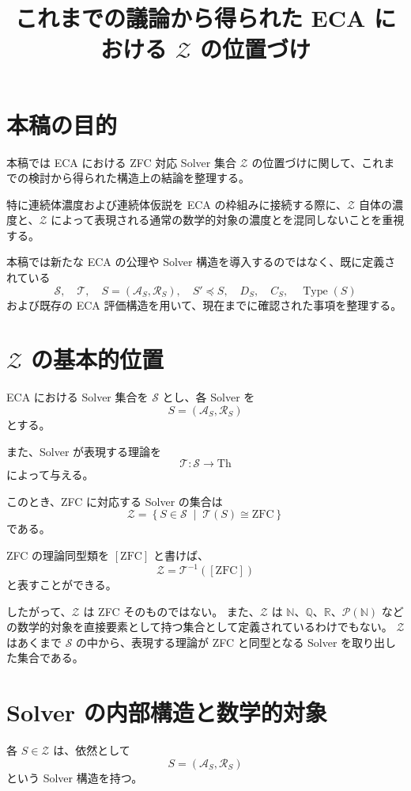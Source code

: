 \documentclass[a4paper,11pt]{article}
\title{これまでの議論から得られた ECA における $\mathcal{Z}$ の位置づけ}
\author{}
\date{}
\begin{document}
\maketitle

\section{本稿の目的}

本稿では ECA における ZFC 対応 Solver 集合 $\mathcal{Z}$ の位置づけに関して、これまでの検討から得られた構造上の結論を整理する。

特に連続体濃度および連続体仮説を ECA の枠組みに接続する際に、$\mathcal{Z}$ 自体の濃度と、$\mathcal{Z}$ によって表現される通常の数学的対象の濃度とを混同しないことを重視する。

本稿では新たな ECA の公理や Solver 構造を導入するのではなく、既に定義されている
\[
\mathcal{S},\quad
\mathcal{T},\quad
S=(\mathcal{A}_S,\mathcal{R}_S),\quad
S'\preceq S,\quad
D_S,\quad
C_S,\quad
\operatorname{Type}(S)
\]
および既存の ECA 評価構造を用いて、現在までに確認された事項を整理する。

\section{$\mathcal{Z}$ の基本的位置}

ECA における Solver 集合を $\mathcal{S}$ とし、各 Solver を
\[
S=(\mathcal{A}_S,\mathcal{R}_S)
\]
とする。

また、Solver が表現する理論を
\[
\mathcal{T}:\mathcal{S}\longrightarrow\mathrm{Th}
\]
によって与える。

このとき、ZFC に対応する Solver の集合は
\[
\boxed{
\mathcal{Z}
=
\left\{
S\in\mathcal{S}
\;\middle|\;
\mathcal{T}(S)\cong\mathrm{ZFC}
\right\}
}
\]
である。

ZFC の理論同型類を $[\mathrm{ZFC}]$ と書けば、
\[
\boxed{
\mathcal{Z}
=
\mathcal{T}^{-1}\left([\mathrm{ZFC}]\right)
}
\]
と表すことができる。

したがって、$\mathcal{Z}$ は ZFC そのものではない。
また、$\mathcal{Z}$ は $\mathbb{N}$、$\mathbb{Q}$、$\mathbb{R}$、$\mathcal{P}(\mathbb{N})$ などの数学的対象を直接要素として持つ集合として定義されているわけでもない。
$\mathcal{Z}$ はあくまで $\mathcal{S}$ の中から、表現する理論が ZFC と同型となる Solver を取り出した集合である。

\section{Solver の内部構造と数学的対象}
各 $S\in\mathcal{Z}$ は、依然として
\[
S=(\mathcal{A}_S,\mathcal{R}_S)
\]
という Solver 構造を持つ。
\end{document}
